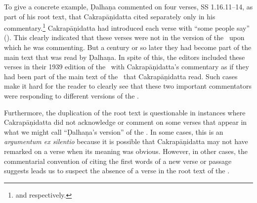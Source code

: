 To give a concrete example, Ḍalhaṇa commented on four verses, SS 1.16.11--14,
as part of his root text, that Cakrapāṇidatta cited separately only in his
commentary.\footnote{\cite[78]{vulgate} and \cite[128--129]{acar-1939}
    respectively.} Cakrapāṇidatta had introduced each verse with “some people say”
    (). This clearly indicated that these verses were not in
    the version of the \SS\ upon which he was commenting.  But a century or so
    later they had become part of the main text that was read by Ḍalhaṇa. In spite
    of this, the editors \citeauthor{acar-1939} included these verses in their
    1939 edition of the \SS\ with Cakrapāṇidatta's commentary as if they had been
    part of the main text of the \SS\ that Cakrapāṇidatta read. Such cases make it
    hard for the reader to clearly see that these two important commentators were
    responding to different versions of the \SS.

Furthermore, the duplication of the root text is questionable in instances
where Cakrapāṇidatta did not acknowledge or comment on some verses that appear
in what we might call “Ḍalhaṇa's version” of the \SS.  In some cases, this is
an \emph{argumentum ex silentio} because it is possible that Cakrapāṇidatta
may not have remarked on a verse when its meaning was obvious. However, in
other cases, the commentarial convention of citing the first words of a new
verse or passage suggests leads us to suspect the absence of a verse in the
root text of the \SS.


